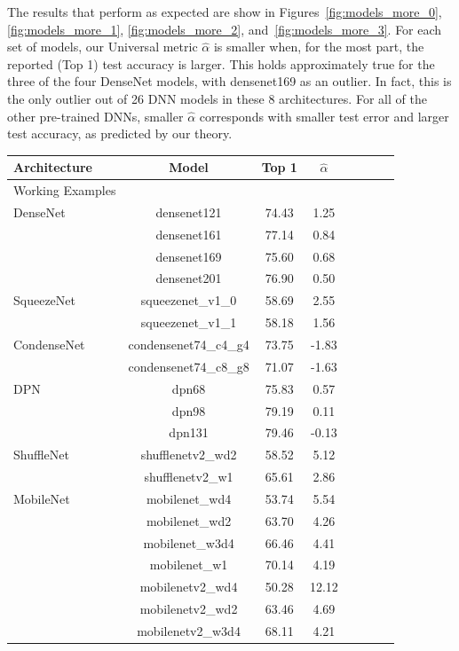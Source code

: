 {The results that perform as expected are show in
Figures~\ref{fig:models_more_0}, 
\ref{fig:models_more_1}, 
\ref{fig:models_more_2}, 
and~\ref{fig:models_more_3}.
For each set of models, our Universal metric $\hat{\alpha}$
is smaller when, for the most part, the reported (Top 1)
test accuracy is larger. 
This holds approximately
true for the three of the four DenseNet models, with
densenet169 as an outlier. 
In fact, this is the only
outlier out of 26 DNN models in these 8 architectures.
For all of the other pre-trained DNNs, smaller
$\hat{\alpha}$ corresponds with smaller test error
and larger test accuracy, as predicted by our theory.

\begin{table}[!htb]
\small
\begin{center}
\begin{tabular}{|p{1in}|c|c|c|c|c|c|c|}
\hline
Architecture 
 & Model
 & Top 1 & $\hat{\alpha} $\\
 \hline
 Working Examples & & & \\
 \hline
 DenseNet
& densenet121 & 74.43 & 1.25 \\
& densenet161 & 77.14 & 0.84 \\
& densenet169 & 75.60 & 0.68 \\
& densenet201 & 76.90 & 0.50 \\
\hline
SqueezeNet
& squeezenet\_v1\_0 & 58.69 & 2.55 \\
& squeezenet\_v1\_1 & 58.18 & 1.56 \\
\hline
CondenseNet
& condensenet74\_c4\_g4 & 73.75 & -1.83 \\
& condensenet74\_c8\_g8 & 71.07 & -1.63 \\
\hline
DPN
& dpn68 & 75.83 & 0.57 \\
& dpn98 & 79.19 & 0.11 \\
& dpn131 & 79.46 & -0.13 \\
\hline
ShuffleNet
& shufflenetv2\_wd2 & 58.52 & 5.12 \\
& shufflenetv2\_w1 & 65.61 & 2.86 \\
\hline
MobileNet
& mobilenet\_wd4 & 53.74 & 5.54 \\
& mobilenet\_wd2 & 63.70 & 4.26 \\
& mobilenet\_w3d4 & 66.46 & 4.41 \\
& mobilenet\_w1 & 70.14 & 4.19 \\
& mobilenetv2\_wd4 & 50.28 & 12.12 \\
& mobilenetv2\_wd2 & 63.46 & 4.69 \\
& mobilenetv2\_w3d4 & 68.11 & 4.21 \\

\end{tabular}
\end{center}
\end{table}}
